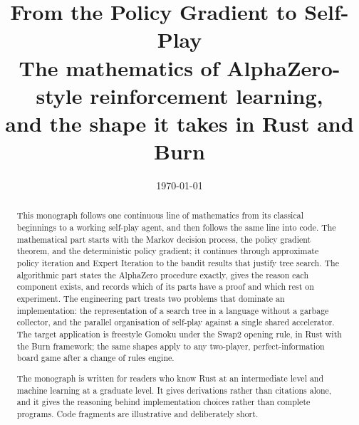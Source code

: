 \documentclass[11pt,a4paper]{article}
\title{\bfseries From the Policy Gradient to Self-Play\\[0.4em]
\large The mathematics of AlphaZero-style reinforcement learning,\\
\large and the shape it takes in Rust and Burn}
\author{}
\date{\today}
\theoremstyle{definition}
\theoremstyle{plain}
\begin{document}
\maketitle

\begin{abstract}
\noindent
This monograph follows one continuous line of mathematics from its classical
beginnings to a working self-play agent, and then follows the same line into
code. The mathematical part starts with the Markov decision process, the
policy gradient theorem, and the deterministic policy gradient; it continues
through approximate policy iteration and Expert Iteration to the bandit
results that justify tree search. The algorithmic part states the AlphaZero
procedure exactly, gives the reason each component exists, and records which
of its parts have a proof and which rest on experiment. The engineering part
treats two problems that dominate an implementation: the representation of a
search tree in a language without a garbage collector, and the parallel
organisation of self-play against a single shared accelerator. The target
application is freestyle Gomoku under the Swap2 opening rule, in Rust with
the Burn framework; the same shapes apply to any two-player,
perfect-information board game after a change of rules engine.

The monograph is written for readers who know Rust at an intermediate level
and machine learning at a graduate level. It gives derivations rather than
citations alone, and it gives the reasoning behind implementation choices
rather than complete programs. Code fragments are illustrative and
deliberately short.
\end{abstract}

\tableofcontents










\appendix




\end{document}
